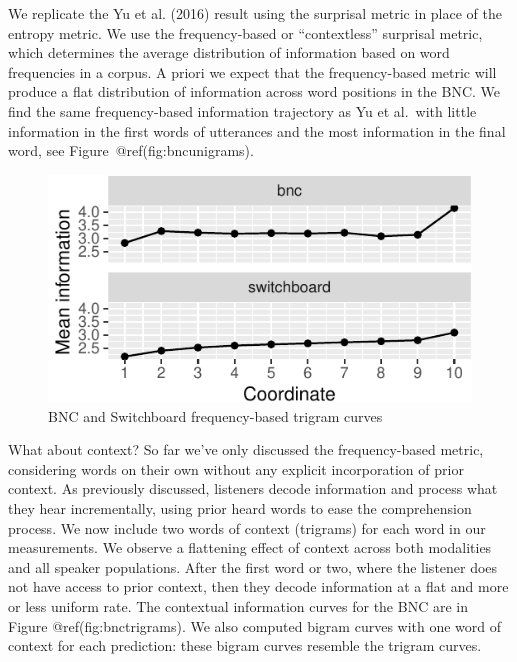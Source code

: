 \documentclass[10pt, letterpaper]{article}
\newenvironment{CodeChunk}{}{}
\begin{document}
We replicate the Yu et al. (2016) result using the surprisal metric in
place of the entropy metric. We use the frequency-based or
``contextless'' surprisal metric, which determines the average
distribution of information based on word frequencies in a corpus. A
priori we expect that the frequency-based metric will produce a flat
distribution of information across word positions in the BNC. We find
the same frequency-based information trajectory as Yu et al.~with little
information in the first words of utterances and the most information in
the final word, see Figure~@ref(fig:bncunigrams).

\begin{CodeChunk}
\begin{figure}[tb]
\includegraphics{figs/bncunigrams-1} \caption[BNC and Switchboard frequency-based trigram curves]{BNC and Switchboard frequency-based trigram curves}\label{fig:bncunigrams}
\end{figure}
\end{CodeChunk}

What about context? So far we've only discussed the frequency-based
metric, considering words on their own without any explicit
incorporation of prior context. As previously discussed, listeners
decode information and process what they hear incrementally, using prior
heard words to ease the comprehension process. We now include two words
of context (trigrams) for each word in our measurements. We observe a
flattening effect of context across both modalities and all speaker
populations. After the first word or two, where the listener does not
have access to prior context, then they decode information at a flat and
more or less uniform rate. The contextual information curves for the BNC
are in Figure @ref(fig:bnctrigrams). We also computed bigram curves with
one word of context for each prediction: these bigram curves resemble
the trigram curves.
\end{document}
